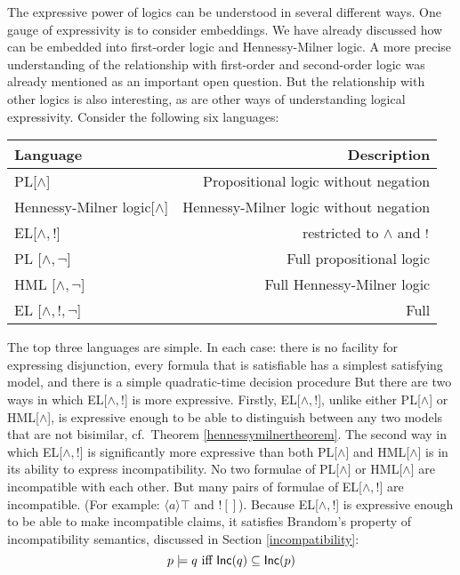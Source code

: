 The expressive power of logics can be understood in several different
ways. One gauge of expressivity is to consider embeddings.  We have
already discussed how \cathoristic{} can be embedded into first-order
logic and Hennessy-Milner logic.  A more precise understanding of the
relationship with first-order and second-order logic was already
mentioned as an important open question. But the relationship with
other logics is also interesting, as are other ways of understanding
logical expressivity.  Consider the following six languages:



\begin{center}
\begin{tabular}{ l | r }
Language & Description \\
\hline
PL[$\land$] & Propositional logic without negation \\
Hennessy-Milner logic[$\land$] & Hennessy-Milner logic without negation \\
EL[$\land, !$] & \Cathoristic{} restricted to $\land$ and $!$ \\
PL [$\land, \neg$] & Full propositional logic \\
HML [$\land, \neg$] & Full Hennessy-Milner logic \\
EL [$\land, !, \neg$] & Full \cathoristic{} \\
\end{tabular}
\end{center}


\NI The top three languages are simple. In each case: there is no
facility for expressing disjunction, every formula that is satisfiable
has a simplest satisfying model, and there is a simple quadratic-time
decision procedure But there are two ways in which EL[$\land, !$] is
more expressive.  Firstly, EL[$\land, !$], unlike either PL[$\land$]
or HML[$\land$], is expressive enough to be able to distinguish
between any two models that are not bisimilar, cf.~Theorem
\ref{hennessymilnertheorem}.  The second way in which
EL[$\land, !$] is significantly more expressive than both PL[$\land$]
and HML[$\land$] is in its ability to express incompatibility.  No two
formulae of PL[$\land$] or HML[$\land$] are incompatible with each
other.  But many
pairs of formulae of EL[$\land, !$] are incompatible.  (For example:
$\langle a \rangle \top$ and $! []$).  Because EL[$\land, !$] is
expressive enough to be able to make incompatible claims, it satisfies
Brandom's property of incompatibility semantics, discussed in Section
\ref{incompatibility}:
\[
   p \models q \mbox{ iff } \mathsf{Inc}(q) \subseteq \mathsf{Inc}(p)
\]

